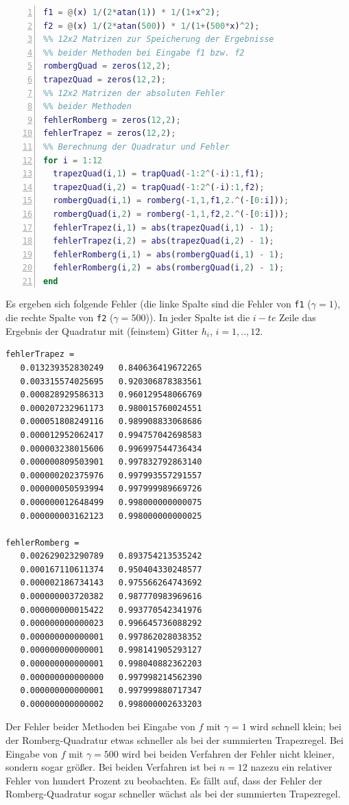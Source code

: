 \documentclass[11pt,a4paper,ngerman]{article}
\begin{document}
\begin{lstlisting}[language=matlab,numbers=left]
%% f1 und f2 sind die beiden zu integrierenden Funktionen
f1 = @(x) 1/(2*atan(1)) * 1/(1+x^2);
f2 = @(x) 1/(2*atan(500)) * 1/(1+(500*x)^2);
%% 12x2 Matrizen zur Speicherung der Ergebnisse
%% beider Methoden bei Eingabe f1 bzw. f2
rombergQuad = zeros(12,2);
trapezQuad = zeros(12,2);
%% 12x2 Matrizen der absoluten Fehler
%% beider Methoden
fehlerRomberg = zeros(12,2);
fehlerTrapez = zeros(12,2);
%% Berechnung der Quadratur und Fehler
for i = 1:12
  trapezQuad(i,1) = trapQuad(-1:2^(-i):1,f1);
  trapezQuad(i,2) = trapQuad(-1:2^(-i):1,f2);
  rombergQuad(i,1) = romberg(-1,1,f1,2.^(-[0:i]));
  rombergQuad(i,2) = romberg(-1,1,f2,2.^(-[0:i]));
  fehlerTrapez(i,1) = abs(trapezQuad(i,1) - 1);
  fehlerTrapez(i,2) = abs(trapezQuad(i,2) - 1);
  fehlerRomberg(i,1) = abs(rombergQuad(i,1) - 1);
  fehlerRomberg(i,2) = abs(rombergQuad(i,2) - 1);
end
\end{lstlisting}

Es ergeben sich folgende Fehler (die linke Spalte sind die Fehler von \texttt{f1} ($\gamma = 1$), die rechte Spalte von \texttt{f2} ($\gamma = 500$)). In jeder Spalte ist die $i-te$ Zeile das Ergebnis der Quadratur mit
(feinstem) Gitter $h_i$, $i = 1,.., 12$.
\begin{lstlisting}[basicstyle=\ttfamily\scriptsize\selectfont\upshape]
fehlerTrapez =
   0.013239352830249   0.840636419672265
   0.003315574025695   0.920306878383561
   0.000828929586313   0.960129548066769
   0.000207232961173   0.980015760024551
   0.000051808249116   0.989908833068686
   0.000012952062417   0.994757042698583
   0.000003238015606   0.996997544736434
   0.000000809503901   0.997832792863140
   0.000000202375976   0.997993557291557
   0.000000050593994   0.997999989669726
   0.000000012648499   0.998000000000075
   0.000000003162123   0.998000000000025

fehlerRomberg =
   0.002629023290789   0.893754213535242
   0.000167110611374   0.950404330248577
   0.000002186734143   0.975566264743692
   0.000000003720382   0.987770983969616
   0.000000000015422   0.993770542341976
   0.000000000000023   0.996645736088292
   0.000000000000001   0.997862028038352
   0.000000000000001   0.998141905293127
   0.000000000000001   0.998040882362203
   0.000000000000000   0.997998214562390
   0.000000000000001   0.997999880717347
   0.000000000000002   0.998000002633203
\end{lstlisting}

Der Fehler beider Methoden bei Eingabe von $f$ mit $\gamma = 1$ wird schnell klein; bei der Romberg-Quadratur etwas schneller als bei der summierten Trapezregel. Bei Eingabe von $f$ mit $\gamma = 500$ wird bei beiden Verfahren der Fehler nicht kleiner, sondern sogar größer. Bei beiden Verfahren ist bei $n=12$ nazezu ein relativer Fehler von hundert Prozent zu beobachten. Es fällt auf, dass der Fehler der Romberg-Quadratur sogar schneller wächst als bei der summierten Trapezregel.
\end{document}
